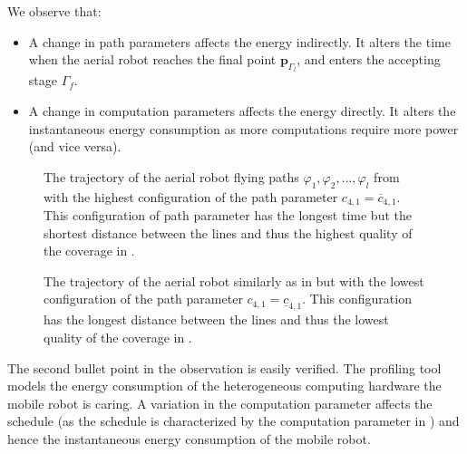 \begin{highlight}
  \begin{obs}
    We observe that:
    \begin{itemize}
      \item A change in path parameters affects the energy indirectly. It alters the time when the aerial robot reaches the final point $\mathbf{p}_{\Gamma_l}$, and enters the accepting stage $\Gamma_f$.
      \item A change in computation parameters affects the energy directly. It alters the instantaneous energy consumption as more computations require more power (and vice versa).
    \end{itemize}
  \end{obs}
\end{highlight}

\begin{figure}[p]
  \centering
  \selectfont
  
  \caption[Trajectory of the aerial robot flying the highest path configuration]{The trajectory of the aerial robot flying paths $\varphi_1,\varphi_2,\dots,\varphi_l$ from  with the highest configuration of the path parameter $c_{4,1}=\overline{c}_{4,1}$. This configuration of path parameter has the longest time but the shortest distance between the lines and thus the highest quality of the coverage in .}
  \label{fig:plot-8}
\end{figure}
\begin{figure}[p]
  \centering
  \selectfont
  
  \caption[Trajectory of the aerial robot flying the lowest path configuration]{The trajectory of the aerial robot similarly as in  but with the lowest configuration of the path parameter $c_{4,1}=\underline{c}_{4,1}$. This configuration has the longest distance between the lines and thus the lowest quality of the coverage in .}
  \label{fig:plot-9}
\end{figure}

The second bullet point in the observation is easily verified. The \powprof{} profiling tool models the energy consumption of the heterogeneous computing hardware the mobile robot is caring. A variation in the computation parameter affects the schedule (as the schedule is characterized by the computation parameter in ) and hence the instantaneous energy consumption of the mobile robot.

